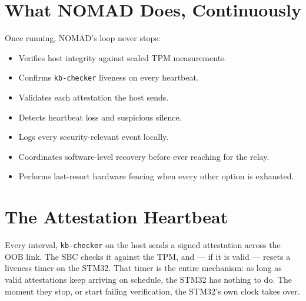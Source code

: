 \documentclass[11pt,a4paper]{article}
\begin{document}
\section{What NOMAD Does, Continuously}

Once running, NOMAD's loop never stops:

\begin{itemize}
  \item Verifies host integrity against sealed TPM measurements.
  \item Confirms \texttt{kb-checker} liveness on every heartbeat.
  \item Validates each attestation the host sends.
  \item Detects heartbeat loss and suspicious silence.
  \item Logs every security-relevant event locally.
  \item Coordinates software-level recovery before ever reaching for
    the relay.
  \item Performs last-resort hardware fencing when every other option
    is exhausted.
\end{itemize}

\section{The Attestation Heartbeat}
\label{sec:heartbeat}

Every interval, \texttt{kb-checker} on the host sends a signed
attestation across the OOB link. The SBC checks it against the TPM,
and --- if it is valid --- resets a liveness timer on the STM32. That
timer is the entire mechanism: as long as valid attestations keep
arriving on schedule, the STM32 has nothing to do. The moment they
stop, or start failing verification, the STM32's own clock takes over.
\end{document}
